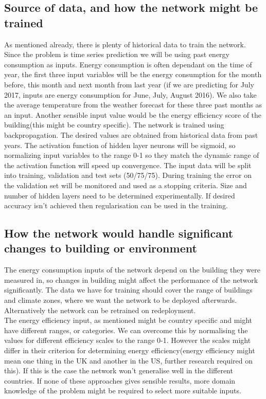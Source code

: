 \documentclass[a4paper, 11pt]{article}
\begin{document}
\subsection{Source of data, and how the network might be trained}
As mentioned already, there is plenty of historical data to train the network. Since the problem is time series prediction we will be using past energy consumption as inputs. Energy consumption is often dependant on the time of year, the first three input variables will be the energy consumption for the month before, this month and next month from last year (if we are predicting for July 2017, inputs are energy consumption for June, July, August 2016). We also take the average temperature from the weather forecast for these three past months as an input. Another sensible input value would be the energy efficiency score of the building(this might be country specific).
The network is trained using backpropagation. The desired values are obtained from historical data from past years. The activation function of hidden layer neurons will be sigmoid, so normalizing input variables to the range 0-1 so they match the dynamic range of the activation function will speed up convergence. The input data will be split into training, validation and test sets (50/75/75). During training the error on the validation set will be monitored and used as a stopping criteria. Size and number of hidden layers need to be determined experimentally. If desired accuracy isn't achieved then regularisation can be used in the training. 
\subsection{How the network would handle significant changes to building or environment}
The energy consumption inputs of the network depend on the building they were measured in, so changes in building might affect the performance of the network significantly. The data we have for training should cover the range of buildings and climate zones, where we want the network to be deployed afterwards. Alternatively the network can be retrained on redeployment. \\
The energy efficiency input, as mentioned might be country specific and might have different ranges, or categories. We can overcome this by normalising the values for different efficiency scales to the range 0-1. However the scales might differ in their criterion for determining energy efficiency(energy efficiency might mean one thing in the UK and another in the US, further research required on this). If this is the case the network won't generalise well in the different countries. If none of these approaches gives sensible results, more domain knowledge of the problem might be required to select more suitable inputs. 
\end{document}
